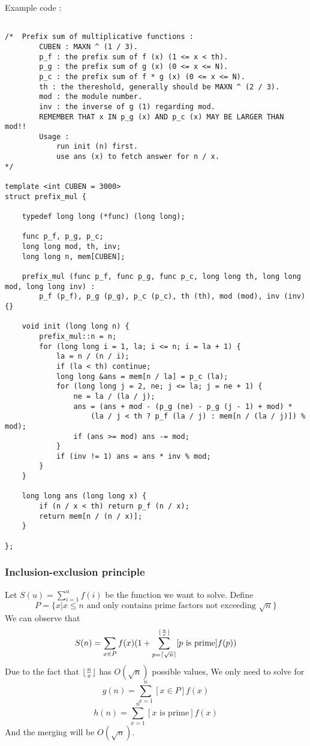 Example code :

\begin{lstlisting}

/*	Prefix sum of multiplicative functions :
		CUBEN : MAXN ^ (1 / 3).
		p_f : the prefix sum of f (x) (1 <= x < th).
		p_g : the prefix sum of g (x) (0 <= x <= N).
		p_c : the prefix sum of f * g (x) (0 <= x <= N).
		th : the thereshold, generally should be MAXN ^ (2 / 3).
		mod : the module number.
		inv : the inverse of g (1) regarding mod.
		REMEMBER THAT x IN p_g (x) AND p_c (x) MAY BE LARGER THAN mod!!
		Usage :
			run init (n) first.
			use ans (x) to fetch answer for n / x.
*/

template <int CUBEN = 3000>
struct prefix_mul {

	typedef long long (*func) (long long);

	func p_f, p_g, p_c;
	long long mod, th, inv;
	long long n, mem[CUBEN];

	prefix_mul (func p_f, func p_g, func p_c, long long th, long long mod, long long inv) : 
		p_f (p_f), p_g (p_g), p_c (p_c), th (th), mod (mod), inv (inv) {}

	void init (long long n) {
		prefix_mul::n = n;
		for (long long i = 1, la; i <= n; i = la + 1) {
			la = n / (n / i);
			if (la < th) continue;
			long long &ans = mem[n / la] = p_c (la);
			for (long long j = 2, ne; j <= la; j = ne + 1) {
				ne = la / (la / j);
				ans = (ans + mod - (p_g (ne) - p_g (j - 1) + mod) * 
					(la / j < th ? p_f (la / j) : mem[n / (la / j)]) % mod);
				if (ans >= mod) ans -= mod;
			}
			if (inv != 1) ans = ans * inv % mod;
		}
	}

	long long ans (long long x) {
		if (n / x < th) return p_f (n / x);
		return mem[n / (n / x)];
	}

};

\end{lstlisting}

\subsubsection{Inclusion-exclusion principle}

Let $S(u)=\sum_{i=1}^uf(i)$ be the function we want to solve. Define
$$P = \{x|x \leq n \text{ and only contains prime factors not exceeding } \sqrt{n}\}$$
We can observe that $$S(n)=\sum_{x \in P} f(x)(1 + \sum_{p=\lceil\sqrt{n}\rceil}^{\lfloor\frac{n}{x}\rfloor}[p \text{ is prime}]f(p))$$
Due to the fact that $\lfloor\frac{n}{x}\rfloor$ has $O(\sqrt{n})$ possible values, We only need to solve for
$$g(n)=\sum_{x=1}^{n}[x \in P]f(x)$$
$$h(n)=\sum_{x=1}^{n}[x \text{ is prime}]f(x)$$
And the merging will be $O(\sqrt{n})$.

